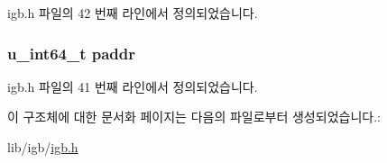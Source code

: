 igb.\+h 파일의 42 번째 라인에서 정의되었습니다.

\subsubsection[{\texorpdfstring{paddr}{paddr}}]{\setlength{\rightskip}{0pt plus 5cm}u\+\_\+int64\+\_\+t paddr}\hypertarget{structresource_ac1f7f4ff311d1bc193e88d7cd3230bc6}{}\label{structresource_ac1f7f4ff311d1bc193e88d7cd3230bc6}


igb.\+h 파일의 41 번째 라인에서 정의되었습니다.



이 구조체에 대한 문서화 페이지는 다음의 파일로부터 생성되었습니다.\+:\begin{DoxyCompactItemize}
\item 
lib/igb/\hyperlink{lib_2igb_2igb_8h}{igb.\+h}\end{DoxyCompactItemize}
